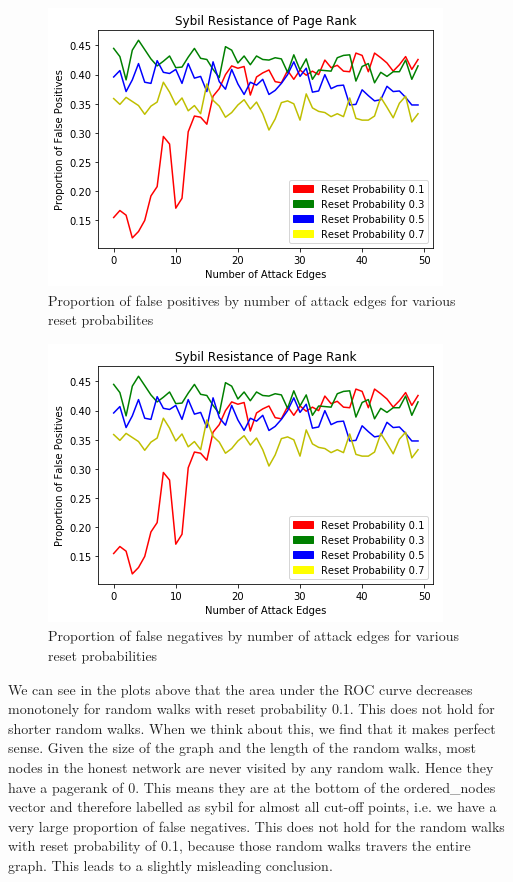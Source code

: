 \documentclass[sigconf]{acmart}
\theoremstyle{definition}
\begin{document}
\begin{figure}
\includegraphics[scale=0.6]{ROCArea2}
\caption{Proportion of false positives by number of attack edges for various reset probabilites}
\label{fig:ROCArea2}
\end{figure}

\begin{figure}
\includegraphics[scale=0.6]{ROCArea2}
\caption{Proportion of false negatives by number of attack edges for various reset probabilities}
\label{fig:ROCArea3}
\end{figure}

We can see in the plots above that the area under the ROC curve decreases monotonely for random walks with reset probability 0.1. This does not hold for shorter random walks. When we think about this, we find that it makes perfect sense. Given the size of the graph and the length of the random walks, most nodes in the honest network are never visited by any random walk. Hence they have a pagerank of 0. This means they are at the bottom of the ordered\_{}nodes vector and therefore labelled as sybil for almost all cut-off points, i.e. we have a very large proportion of false negatives. This does not hold for the random walks with reset probability of 0.1, because those random walks travers the entire graph. This leads to a slightly misleading conclusion. \vspace{1em}\\
\end{document}
